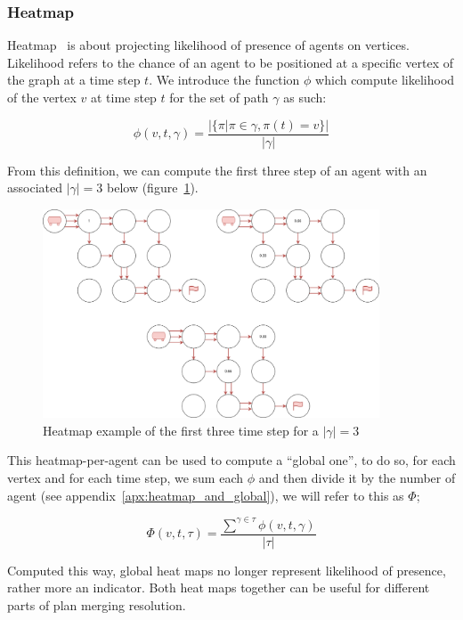 \subsubsection{Heatmap}\label{sec:heatmap}

Heatmap~\cite{atstfestko20a} is about projecting likelihood of presence of agents on vertices. Likelihood refers to the chance of an agent to be positioned at a specific vertex of the graph at a time step \(t\). We introduce the function \(\phi\) which compute likelihood of the vertex \(v\) at time step \(t\) for the set of path \(\gamma\) as such:

\[
  \phi(v, t, \gamma) = \frac{ |\{ \pi | \pi \in \gamma, \pi(t) = v \}|}{|\gamma| }
\]
  
From this definition, we can compute the first three step of an agent with an associated \(|\gamma|=3\) below (figure~\ref{img:heatmap}).

\begin{figure}[H]
  \centering
  \caption{Heatmap example of the first three time step for a \(|\gamma|=3\) }\label{img:heatmap}
  \includegraphics[width=10cm]{img/heatmap.drawio.png}
\end{figure}

This heatmap-per-agent can be used to compute a ``global one'', to do so, for each vertex and for each time step, we sum each \(\phi\) and then divide it by the number of agent (see appendix~\ref{apx:heatmap_and_global}), we will refer to this as \(\Phi\);

\[
  \Phi(v,t,\tau) = \frac{ {\sum^{\gamma \in \tau} }{\phi(v,t,\gamma)}}  {|\tau|}
\]



Computed this way, global heat maps no longer represent likelihood of presence, rather more an indicator. Both heat maps together can be useful for different parts of plan merging resolution.



